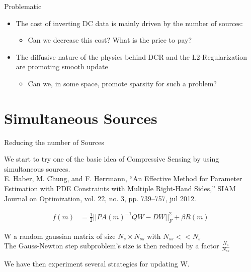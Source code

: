 \documentclass[12pt]{beamer}
\begin{document}
\begin{frame}{Problematic}

\begin{itemize}
  \item The cost of inverting DC data is mainly driven by the number of sources:
  \begin{itemize}
    \item Can we decrease this cost? What is the price to pay?
  \end{itemize}
\vspace{20pt}
  \item The diffusive nature of the physics behind DCR and the L2-Regularization are promoting smooth update
  \begin{itemize}
    \item Can we, in some space, promote sparsity for such a problem?
  \end{itemize}
\end{itemize}

\end{frame}

\section{Simultaneous Sources}

\begin{frame}{Reducing the number of Sources}

We start to try one of the basic idea of Compressive Sensing by using simultaneous sources. \\
{\color{gray}E. Haber, M. Chung, and F. Herrmann, “An Effective Method for Parameter Estimation with PDE Constraints with Multiple Right-Hand Sides,” 
SIAM Journal on Optimization, vol. 22, no. 3, pp. 739–757, jul 2012.}

\begin{align}
f(m) & = \frac{1}{2} ||PA(m)^{-1}QW-DW||_F^2  +\beta R(m)
\end{align}

W a random gaussian matrix of size $N_s \times N_{ss}$ with $N_{ss}<<N_s$ \\
The Gauss-Newton step subproblem's size is then reduced by a factor $\frac{N_{s}}{N_{ss}}$

We have then experiment several strategies for updating W.

\end{frame}
\end{document}
